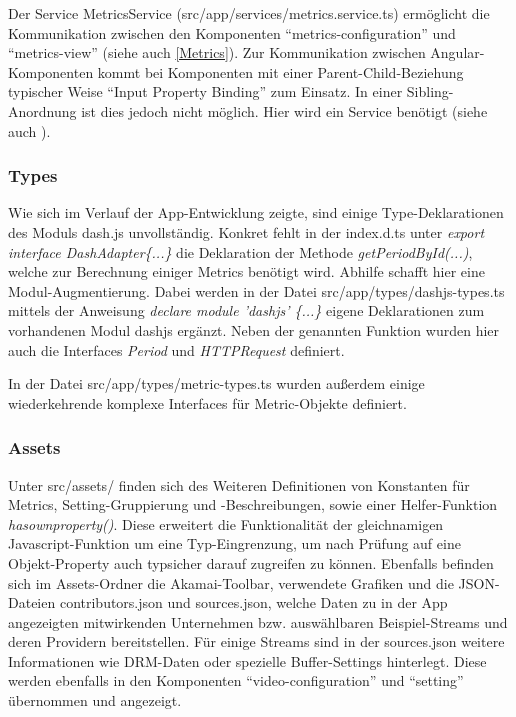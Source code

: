 \documentclass[conference]{IEEEtran}
\begin{document}
Der Service MetricsService (src/app/services/metrics.service.ts) ermöglicht die Kommunikation zwischen den Komponenten ``metrics-configuration'' und ``metrics-view'' (siehe auch \ref{Metrics}). Zur Kommunikation zwischen Angular-Komponenten kommt bei Komponenten mit einer Parent-Child-Beziehung typischer Weise ``Input Property Binding'' zum Einsatz. In einer Sibling-Anordnung ist dies jedoch nicht möglich. Hier wird ein Service benötigt (siehe auch \cite{b10}).

\subsubsection{Types}
Wie sich im Verlauf der App-Entwicklung zeigte, sind einige Type-Deklarationen des Moduls dash.js unvollständig. Konkret fehlt in der index.d.ts unter \emph{export interface DashAdapter\{...\}} die Deklaration der Methode \emph{getPeriodById(...)}, welche zur Berechnung einiger Metrics benötigt wird. Abhilfe schafft hier eine Modul-Augmentierung. Dabei werden in der Datei src/app/types/dashjs-types.ts mittels der Anweisung \emph{declare module 'dashjs' \{...\}} eigene Deklarationen zum vorhandenen Modul dashjs ergänzt. Neben der genannten Funktion wurden hier auch die Interfaces \emph{Period} und \emph{HTTPRequest} definiert.

In der Datei src/app/types/metric-types.ts wurden außerdem einige wiederkehrende komplexe Interfaces für Metric-Objekte definiert.

\subsubsection{Assets}
Unter src/assets/ finden sich des Weiteren Definitionen von Konstanten für Metrics, Setting-Gruppierung und -Beschreibungen, sowie einer Helfer-Funktion \emph{hasownproperty()}. Diese erweitert die Funktionalität der gleichnamigen Javascript-Funktion um eine Typ-Eingrenzung, um nach Prüfung auf eine Objekt-Property auch typsicher darauf zugreifen zu können. Ebenfalls befinden sich im Assets-Ordner die Akamai-Toolbar, verwendete Grafiken und die JSON-Dateien contributors.json und sources.json, welche Daten zu in der App angezeigten mitwirkenden Unternehmen bzw. auswählbaren Beispiel-Streams und deren Providern bereitstellen. Für einige Streams sind in der sources.json weitere Informationen wie DRM-Daten oder spezielle Buffer-Settings hinterlegt. Diese werden ebenfalls in den Komponenten ``video-configuration'' und ``setting'' übernommen und angezeigt.
\end{document}
